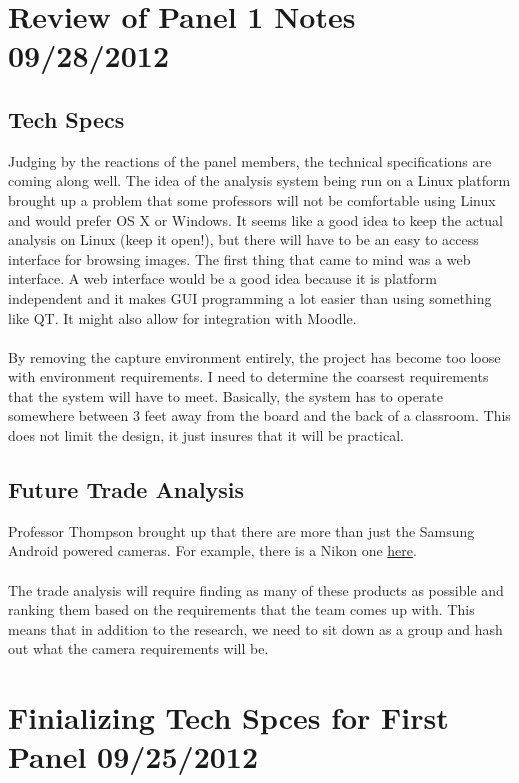 \documentclass[]{article}
\begin{document}
	\section{Review of Panel 1 Notes 09/28/2012}
		
		\subsection{Tech Specs}
			Judging by the reactions of the panel members, the technical specifications are coming along well. The idea of the analysis system being run on a Linux platform brought up a problem that some professors will not be comfortable using Linux and would prefer OS X or Windows. It seems like a good idea to keep the actual analysis on Linux (keep it open!), but there will have to be an easy to access interface for browsing images. The first thing that came to mind was a web interface. A web interface would be a good idea because it is platform independent and it makes GUI programming a lot easier than using something like QT. It might also allow for integration with Moodle. \\
			\\
			By removing the capture environment entirely, the project has become too loose with environment requirements. I need to determine the coarsest requirements that the system will have to meet. Basically, the system has to operate somewhere between 3 feet away from the board and the back of a classroom. This does not limit the design, it just insures that it will be practical. 
			
		\subsection{Future Trade Analysis}
			Professor Thompson brought up that there are more than just the Samsung Android powered cameras. For example, there is a Nikon one \href{http://www.engadget.com/2012/08/22/nikon-coolpix-s800c-android-camera-pricing-ship-date-details/}{here}.\\
			\\
			The trade analysis will require finding as many of these products as possible and ranking them based on the requirements that the team comes up with. This means that in addition to the research, we need to sit down as a group and hash out what the camera requirements will be. 
	
	\section{Finializing Tech Spces for First Panel 09/25/2012}
		
\end{document}
